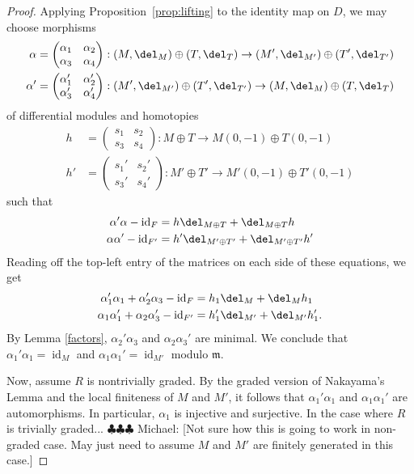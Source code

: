 \documentclass[12pt]{amsart}
\theoremstyle{definition}
\theoremstyle{remark}
\newcommand{\m}{\mathfrak m}
\newcommand{\id}{\operatorname{id}}
\newcommand{\michael}[1]{{\color{red} \sf $\clubsuit\clubsuit\clubsuit$ Michael: [#1]}}
\def\a{\alpha}
\begin{document}
\begin{proof} 
Applying Proposition~\ref{prop:lifting} to the identity map on $D$, we may choose morphisms
\begin{align*}
\a = \begin{pmatrix} \a_1 & \a_2 \\ \a_3 & \a_4 \end{pmatrix}   :  (M, \del_M) \oplus (T, \del_T) \to (M', \del_{M'}) \oplus (T', \del_{T'}) \\
\a' = \begin{pmatrix} \a'_1 & \a'_2 \\ \a'_3 & \a'_4 \end{pmatrix} :  (M', \del_{M'}) \oplus (T', \del_{T'}) \to (M, \del_M) \oplus (T, \del_T) 
\end{align*}
of differential modules and homotopies
\begin{align*}
h & = \begin{pmatrix} s_1 & s_2 \\ s_3 & s_4 \end{pmatrix} : M \oplus T \to M(0, -1) \oplus T(0, -1) \\
h' & = \begin{pmatrix} s_1' & s_2' \\ s_3' & s_4' \end{pmatrix} : M' \oplus T' \to M'(0, -1) \oplus T'(0, -1)
\end{align*}
such that
\begin{align*}
\a'\a - \id_{F} &= h \del_{M \oplus T} + \del_{M \oplus T} h \\
\a\a' - \id_{F'} &= h' \del_{M' \oplus T'} + \del_{M' \oplus T'}h'
\end{align*}
Reading off the top-left entry of the matrices on each side of these equations, we get
\begin{align*}
\a_1'\a_1 + \a_2'\a_3  - \id_F&=  h_1 \del_M + \del_M h_1 \\
\a_1\a_1' + \a_2\a_3'  - \id_{F'} &=  h_1' \del_{M'} + \del_{M'} h_1'.
\end{align*}
By Lemma \ref{factors}, $\a_2'\a_3$ and $\a_2\a_3'$ are minimal. We conclude that $\a_1'\a_1 = \id_M$ and $\a_1\a_1' = \id_{M'}$ modulo $\m$. 

Now, assume $R$ is nontrivially graded. By the graded version of Nakayama's Lemma and the local finiteness of $M$ and $M'$, it follows that $\a_1'\a_1$ and $\a_1\a_1'$ are automorphisms. In particular, $\a_1$ is injective and surjective. In the case where $R$ is trivially graded... \michael{Not sure how this is going to work in non-graded case. May just need to assume $M$ and $M'$ are finitely generated in this case.}
\end{proof}
\end{document}
